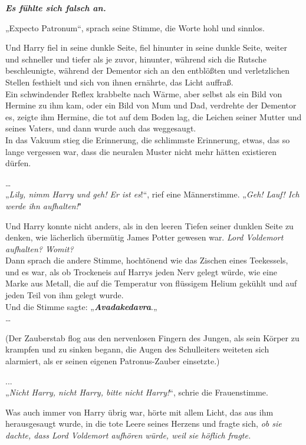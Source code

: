 {\hfill\break \textbf{\emph{Es fühlte sich falsch an.}}

„Expecto Patronum“, sprach seine Stimme, die Worte hohl und sinnlos.

Und Harry fiel in seine dunkle Seite, fiel hinunter in seine dunkle Seite, weiter und schneller und tiefer als je zuvor, hinunter, während sich die Rutsche beschleunigte, während der Dementor sich an den entblößten und verletzlichen Stellen festhielt und sich von ihnen ernährte, das Licht auffraß.\\ Ein schwindender Reflex krabbelte nach Wärme, aber selbst als ein Bild von Hermine zu ihm kam, oder ein Bild von Mum und Dad, verdrehte der Dementor es, zeigte ihm Hermine, die tot auf dem Boden lag, die Leichen seiner Mutter und seines Vaters, und dann wurde auch das weggesaugt.\\ In das Vakuum stieg die Erinnerung, die schlimmste Erinnerung, etwas, das so lange vergessen war, dass die neuralen Muster nicht mehr hätten existieren dürfen.

…\\ „\emph{Lily, nimm Harry und geh! Er ist es}!“, rief eine Männerstimme. „\emph{Geh! Lauf! Ich werde ihn aufhalten!}"

Und Harry konnte nicht anders, als in den leeren Tiefen seiner dunklen Seite zu denken, wie lächerlich übermütig James Potter gewesen war. \emph{Lord Voldemort aufhalten? Womit?}\\ Dann sprach die andere Stimme, hochtönend wie das Zischen eines Teekessels, und es war, als ob Trockeneis auf Harrys jeden Nerv gelegt würde, wie eine Marke aus Metall, die auf die Temperatur von flüssigem Helium gekühlt und auf jeden Teil von ihm gelegt wurde.\\ Und die Stimme sagte: „\textbf{\emph{Avadakedavra}}.„\\ …

(Der Zauberstab flog aus den nervenlosen Fingern des Jungen, als sein Körper zu krampfen und zu sinken begann, die Augen des Schulleiters weiteten sich alarmiert, als er seinen eigenen Patronus-Zauber einsetzte.)

...\\ „\emph{Nicht Harry, nicht Harry, bitte nicht Harry!}“, schrie die Frauenstimme.

Was auch immer von Harry übrig war, hörte mit allem Licht, das aus ihm herausgesaugt wurde, in die tote Leere seines Herzens und fragte sich, \emph{ob sie dachte, dass Lord Voldemort aufhören würde, weil sie höflich fragte.}

}

